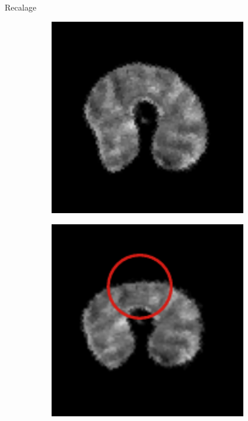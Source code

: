 \documentclass[10pt]{beamer}
\begin{document}
\begin{frame}{Recalage}
\begin{figure}[ht]
\begin{subfigure}[t]{0.25\textwidth}
    \includegraphics[width=0.95\textwidth]{fig/registration_wheat_affine}
    \caption{}
    \label{subfig:registration_wheat_affine}
  \end{subfigure}%
  \begin{subfigure}[t]{0.25\textwidth}
    \centering
    \includegraphics[width=0.95\textwidth]{fig/registration_wheat_ssd}

\end{subfigure}
\end{figure}
\end{frame}
\end{document}

